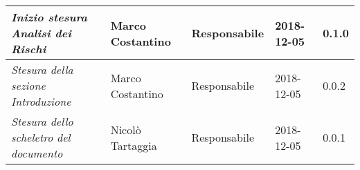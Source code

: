 \begin{table}[H]
\begin{tabular}{p{4cm}|C{3cm}|C{3cm}|R{2.5cm}|R{2cm}}
		\emph{\textit{Inizio stesura Analisi dei Rischi}} & Marco Costantino & Responsabile & 2018-12-05 & 0.1.0 \\
		\hline
		
		\emph{Stesura della sezione Introduzione} & Marco Costantino & Responsabile & 2018-12-05 & 0.0.2 \\
		\hline
		
		\emph{Stesura dello scheletro del documento} & Nicolò Tartaggia & Responsabile & 2018-12-05 & 0.0.1 \\
		
	\end{tabular}
	
\end{table}


\clearpage